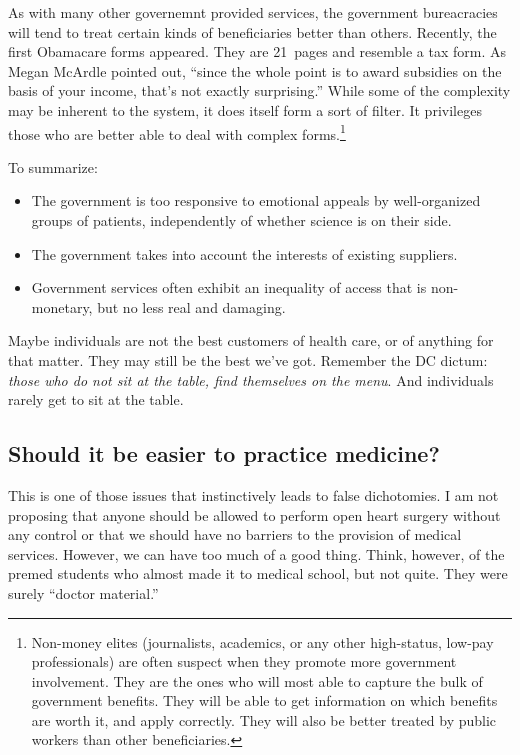 As with many other governemnt provided services, the government bureacracies
will tend to treat certain kinds of beneficiaries better than others.
Recently, the first Obamacare forms appeared. They are 21~pages and resemble a
tax form. As Megan McArdle pointed out, ``since the whole point is to award
subsidies on the basis of your income, that's not exactly
surprising.''
While some of the complexity may be inherent to the system, it does itself form
a sort of filter. It privileges those who are better able to deal with complex
forms.\footnote{Non-money elites (journalists, academics, or any other
high-status, low-pay professionals) are often suspect when they promote more
government involvement. They are the ones who will most able to capture the
bulk of government benefits. They will be able to get information on which
benefits are worth it, and apply correctly. They will also be better treated by
public workers than other beneficiaries.}

To summarize:
\begin{itemize}
\item The government is too responsive to emotional appeals by well-organized
groups of patients, independently of whether science is on their side.
\item The government takes into account the interests of existing suppliers.
\item Government services often exhibit an inequality of access that is
non-monetary, but no less real and damaging.
\end{itemize}

Maybe individuals are not the best customers of health care, or of anything for
that matter. They may still be the best we've got. Remember the DC dictum:
\emph{those who do not sit at the table, find themselves on the menu}. And
individuals rarely get to sit at the table.

\subsection{Should it be easier to practice medicine?}

This is one of those issues that instinctively leads to false dichotomies. I am
not proposing that anyone should be allowed to perform open heart surgery
without any control or that we should have no barriers to the provision of
medical services. However, we can have too much of a good thing. Think,
however, of the premed students who almost made it to medical school, but not
quite.  They were surely ``doctor material.''

